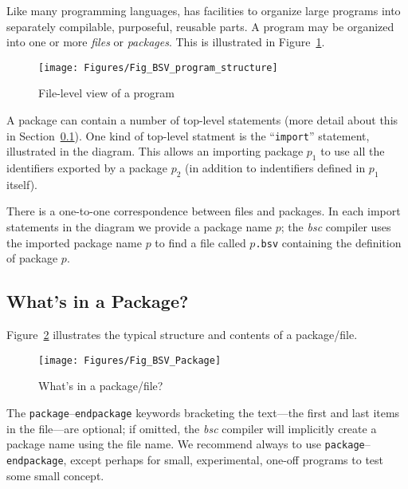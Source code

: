 
Like many programming languages, {\BSV} has facilities to organize large
programs into separately compilable, purposeful, reusable parts.  A
{\BSV} program may be organized into one or more \emph{files} or
\emph{packages}.  This is illustrated in
Figure~\ref{Fig_BSV_program_structure}.
\begin{figure}[htbp]
  \centerline{\texttt{[image: Figures/Fig\_BSV\_program\_structure]}}
  \caption{\label{Fig_BSV_program_structure}
           File-level view of a {\BSV} program}
\end{figure}

A package can contain a number of top-level statements (more detail
about this in Section~\ref{Sec_package_contents}).  One kind of
top-level statment is the ``\verb|import|'' statement, illustrated in
the diagram.  This allows an importing package $p_1$ to use all the
identifiers exported by a package $p_2$ (in addition to indentifiers
defined in $p_1$ itself).

There is a one-to-one correspondence between files and packages.  In
each import statements in the diagram we provide a package name $p$;
the \emph{bsc} compiler uses the imported package name $p$ to find a
file called $p$\verb|.bsv| containing the definition of package $p$.


\subsection{What's in a Package?}

\label{Sec_package_contents}

Figure~\ref{Fig_BSV_Package} illustrates the typical
structure and contents of a package/file.
\begin{figure}[htbp]
  \centerline{\texttt{[image: Figures/Fig\_BSV\_Package]}}
  \caption{\label{Fig_BSV_Package}
           What's in a {\BSV} package/file?}
\end{figure}

The \verb|package|--\verb|endpackage| keywords bracketing the
text---the first and last items in the file---are optional; if
omitted, the \emph{bsc} compiler will implicitly create a package name
using the file name.  We recommend always to use
\verb|package|--\verb|endpackage|, except perhaps for small,
experimental, one-off programs to test some small concept.

